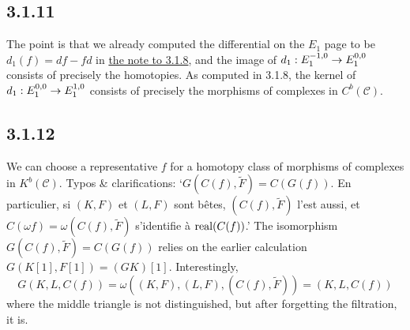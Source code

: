 \documentclass[deligne.tex]{subfiles}
\begin{document}
\subsection*{3.1.11} The point is that we already computed the differential
on the $E_1$ page to be $d_1(f)=df-fd$ in
\hyperref[BBD:3.1.8]{the note to 3.1.8}, and the image of
$d_1:E_1^{-1,0}\rightarrow E_1^{0,0}$ consists of precisely the homotopies.
As computed in 3.1.8, the kernel of $d_1:E_1^{0,0}\rightarrow E_1^{1,0}$ consists
of precisely the morphisms of complexes in $C^b(\mathcal C)$.

\subsection*{3.1.12}
We can choose a representative $f$ for a homotopy class of morphisms of
complexes in $K^b(\mathcal C)$.
Typos \& clarifications:
`$G(C(f),\tilde F)=C(G(f))$. En particulier,
si $(K,F)$ et $(L,F)$ sont bêtes, $(C(f),\tilde F)$ l'est aussi,
et $C(\omega f)=\omega (C(f),\tilde F)$ s'identifie à
$\operatorname{real}(C(f))$.'
The isomorphism $G(C(f),\tilde F)=C(G(f))$ relies on the earlier 
calculation $G(K[1],F[1])=(GK)[1]$.
Interestingly,
\begin{equation*}
	G(K,L,C(f))=\omega((K,F),(L,F),(C(f),\tilde F))=(K,L,C(f))
\end{equation*}
where the middle triangle is not distinguished, but after forgetting the
filtration, it is.
\end{document}
